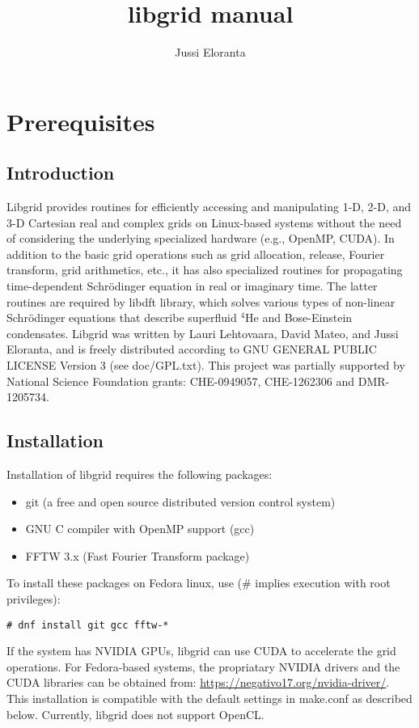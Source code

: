 \documentclass[12pt,letterpaper]{report}
\author{Jussi Eloranta}
\title{libgrid manual}
\begin{document}
\maketitle

\chapter{Prerequisites}

\section{Introduction}

Libgrid provides routines for efficiently accessing and manipulating 1-D, 2-D, and 3-D Cartesian real and complex grids on Linux-based systems without the need of considering the underlying specialized hardware (e.g., OpenMP, CUDA). In addition to the basic grid operations such as grid allocation, release, Fourier transform, grid arithmetics, etc., it has also specialized routines for propagating time-dependent Schr\"odinger equation in real or imaginary time. The latter routines are required by libdft library, which solves various types of non-linear Schr\"odinger equations that describe superfluid $^4$He and Bose-Einstein condensates. Libgrid was written by Lauri Lehtovaara, David Mateo, and Jussi Eloranta, and is freely distributed according to GNU GENERAL PUBLIC LICENSE Version 3 (see doc/GPL.txt). This project was partially supported by National Science Foundation grants: CHE-0949057, CHE-1262306 and DMR-1205734.

\section{Installation}

Installation of libgrid requires the following packages:
\begin{itemize}
\item git (a free and open source distributed version control system)
\item GNU C compiler with OpenMP support (gcc)
\item FFTW 3.x (Fast Fourier Transform package)
\end{itemize}
To install these packages on Fedora linux, use (\# implies execution with root privileges): 
\begin{verbatim}
# dnf install git gcc fftw-*
\end{verbatim}
If the system has NVIDIA GPUs, libgrid can use CUDA to accelerate the grid operations. For Fedora-based systems, the propriatary NVIDIA drivers and the CUDA libraries can be obtained from: \url{https://negativo17.org/nvidia-driver/}. This installation is compatible with the default settings in make.conf as described below. Currently, libgrid does not support OpenCL.
\end{document}
